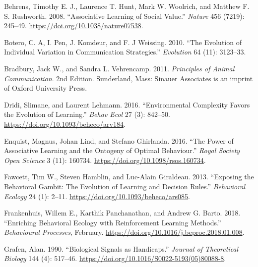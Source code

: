 \documentclass[
  12pt,
]{article}
\newlength{\cslhangindent}
\newlength{\cslentryspacingunit} %
\newenvironment{CSLReferences}[2] %
 {%
  \setlength{\parindent}{0pt}
  \ifodd #1
  \let\oldpar\par
  \def\par{\hangindent=\cslhangindent\oldpar}
  \fi
  \setlength{\parskip}{#2\cslentryspacingunit}
 }%
 {}
\begin{document}
\hypertarget{refs}{}
\begin{CSLReferences}{1}{0}
\leavevmode{}%
Behrens, Timothy E. J., Laurence T. Hunt, Mark W. Woolrich, and Matthew
F. S. Rushworth. 2008. {``Associative Learning of Social Value.''}
\emph{Nature} 456 (7219): 245--49.
\url{https://doi.org/10.1038/nature07538}.

\leavevmode{}%
Botero, C. A, I. Pen, J. Komdeur, and F. J Weissing. 2010. {``The
Evolution of Individual Variation in Communication Strategies.''}
\emph{Evolution} 64 (11): 3123--33.

\leavevmode{}%
Bradbury, Jack W., and Sandra L. Vehrencamp. 2011. \emph{Principles of
{Animal Communication}}. 2nd Edition. {Sunderland, Mass}: {Sinauer
Associates is an imprint of Oxford University Press}.

\leavevmode{}%
Dridi, Slimane, and Laurent Lehmann. 2016. {``Environmental Complexity
Favors the Evolution of Learning.''} \emph{Behav Ecol} 27 (3): 842--50.
\url{https://doi.org/10.1093/beheco/arv184}.

\leavevmode{}%
Enquist, Magnus, Johan Lind, and Stefano Ghirlanda. 2016. {``The Power
of Associative Learning and the Ontogeny of Optimal Behaviour.''}
\emph{Royal Society Open Science} 3 (11): 160734.
\url{https://doi.org/10.1098/rsos.160734}.

\leavevmode{}%
Fawcett, Tim W., Steven Hamblin, and Luc-Alain Giraldeau. 2013.
{``Exposing the Behavioral Gambit: The Evolution of Learning and
Decision Rules.''} \emph{Behavioral Ecology} 24 (1): 2--11.
\url{https://doi.org/10.1093/beheco/ars085}.

\leavevmode{}%
Frankenhuis, Willem E., Karthik Panchanathan, and Andrew G. Barto. 2018.
{``Enriching Behavioral Ecology with Reinforcement Learning Methods.''}
\emph{Behavioural Processes}, February.
\url{https://doi.org/10.1016/j.beproc.2018.01.008}.

\leavevmode{}%
Grafen, Alan. 1990. {``Biological Signals as Handicaps.''} \emph{Journal
of Theoretical Biology} 144 (4): 517--46.
\url{https://doi.org/10.1016/S0022-5193(05)80088-8}.


\end{CSLReferences}
\end{document}
